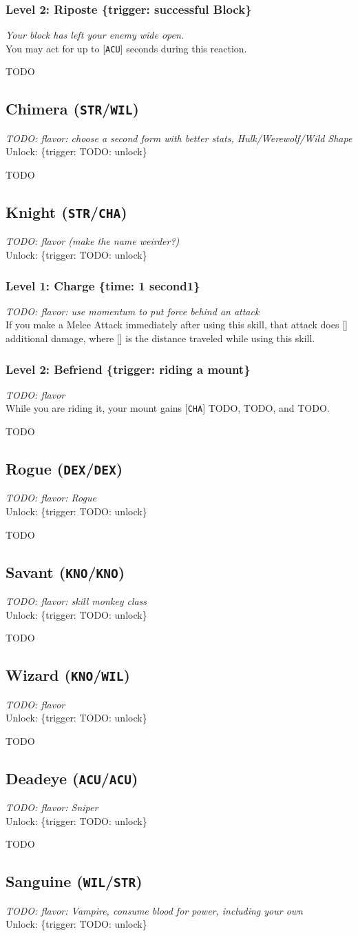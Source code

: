 \documentclass[12pt]{article}
\newcommand{\STR}{\texttt{STR}}
\newcommand{\DEX}{\texttt{DEX}}
\newcommand{\KNO}{\texttt{KNO}}
\newcommand{\ACU}{\texttt{ACU}}
\newcommand{\WIL}{\texttt{WIL}}
\newcommand{\CHA}{\texttt{CHA}}
\newcommand{\X}{\text{{\lower 0.2mm \hbox{X}}}}
\newcommand{\TIME}[1]{\{time: #1 second\if1#1{}\else{s}\fi\}}
\newcommand{\TRIG}[1]{\{trigger: #1\}}
\newcommand{\Class}[4]{\pagebreak\subsection{#1 (#2)}\label{#1}\textit{#3}\\[1mm]Unlock: \TRIG{#4}}
\newcommand{\Skill}[5]{\subsubsection{Level #1: #2 #3}\textit{#4}\\[1mm]#5}
\begin{document}
\Skill{2}{Riposte}{\TRIG{successful Block}}
{Your block has left your enemy wide open.}
{You may act for up to [\ACU] seconds during this reaction.}

TODO

%

\Class{Chimera}{\STR/\WIL}
{TODO: flavor: choose a second form with better stats, Hulk/Werewolf/Wild Shape}
{TODO: unlock}

TODO

%

\Class{Knight}{\STR/\CHA}
{TODO: flavor (make the name weirder?)}
{TODO: unlock}

\Skill{1}{Charge}{\TIME{1}}
{TODO: flavor: use momentum to put force behind an attack}
{If you make a Melee Attack immediately after using this skill, that attack does [\X] additional damage, where [\X] is the distance traveled while using this skill.}

\Skill{2}{Befriend}{\TRIG{riding a mount}}
{TODO: flavor}
{While you are riding it, your mount gains [\CHA] TODO, TODO, and TODO.}

TODO

%

%

\Class{Rogue}{\DEX/\DEX}
{TODO: flavor: Rogue}
{TODO: unlock}

TODO

%

%

%

%

%

%

%

\Class{Savant}{\KNO/\KNO}
{TODO: flavor: skill monkey class}
{TODO: unlock}

TODO

%

%

\Class{Wizard}{\KNO/\WIL}
{TODO: flavor}
{TODO: unlock}

TODO

%

%

%

%

%

\Class{Deadeye}{\ACU/\ACU}
{TODO: flavor: Sniper}
{TODO: unlock}

TODO

%

%

%

\Class{Sanguine}{\WIL/\STR}
{TODO: flavor: Vampire, consume blood for power, including your own}
{TODO: unlock}
\end{document}

